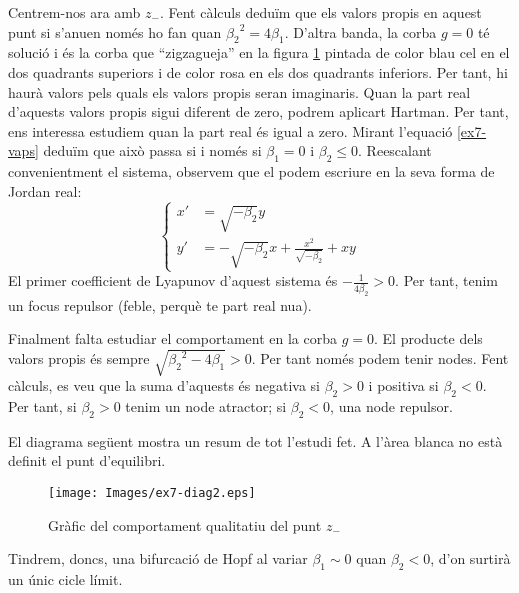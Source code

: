 \documentclass[a4paper]{article}
\theoremstyle{definition}
\begin{document}
Centrem-nos ara amb $z_-$. Fent càlculs deduïm que els valors propis en aquest punt si s'anu\lgem en només ho fan quan ${\beta_2}^2=4\beta_1$. D'altra banda, la corba $g = 0$ té solució i és la corba que ``zigzagueja'' en la figura \ref{ex7z-} pintada de color blau cel en el dos quadrants superiors i de color rosa en els dos quadrants inferiors. Per tant, hi haurà valors pels quals els valors propis seran imaginaris. Quan la part real d'aquests valors propis sigui diferent de zero, podrem aplicart Hartman. Per tant, ens interessa estudiem quan la part real és igual a zero. Mirant l'equació \eqref{ex7-vaps} deduïm que això passa si i només si $\beta_1=0$ i $\beta_2\leq 0$. Reescalant convenientment el sistema, observem que el podem escriure en la seva forma de Jordan real:
\begin{equation*}
  \left\{
  \begin{aligned}
    x' & =\sqrt{-\beta_2}y                                    \\
    y' & =-\sqrt{-\beta_2}x + \frac{x^2}{\sqrt{-\beta_2}} +xy
  \end{aligned}
  \right.
\end{equation*}
El primer coefficient de Lyapunov d'aquest sistema és $-\frac{1}{4\beta_2}>0$. Per tant, tenim un focus repulsor (feble, perquè te part real nu\lgem a).

Finalment falta estudiar el comportament en la corba $g=0$. El producte dels valors propis és sempre $\sqrt{{\beta_2}^2-4\beta_1}> 0$. Per tant només podem tenir nodes. Fent càlculs, es veu que la suma d'aquests és negativa si $\beta_2>0$ i positiva si $\beta_2<0$. Per tant, si $\beta_2>0$ tenim un node atractor; si $\beta_2<0$, una node repulsor.

El diagrama següent mostra un resum de tot l'estudi fet. A l'àrea blanca no està definit el punt d'equilibri.
\begin{figure}[ht]
  \centering
  \texttt{[image: Images/ex7-diag2.eps]}
  \caption{Gràfic del comportament qualitatiu del punt $z_-$}
  \label{ex7z-}
\end{figure}

Tindrem, doncs, una bifurcació de Hopf al variar $\beta_1\sim 0$ quan $\beta_2<0$, d'on surtirà un únic cicle límit.
\end{document}
